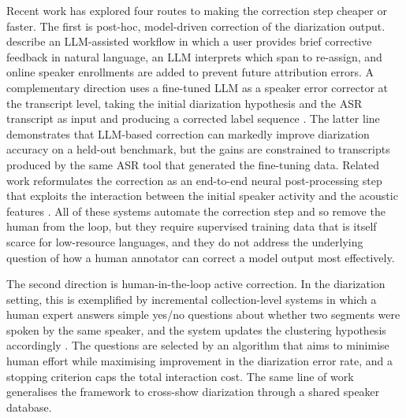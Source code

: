 \documentclass[10pt,a4paper,twocolumn]{article}
\begin{document}
Recent work has explored four routes to making the correction step
cheaper or faster. The first is post-hoc, model-driven correction of
the diarization output. \citet{he2026inmeeting} describe an
LLM-assisted workflow in which a user provides brief corrective
feedback in natural language, an LLM interprets which span to
re-assign, and online speaker enrollments are added to prevent
future attribution errors. A complementary direction uses a
fine-tuned LLM as a speaker error corrector at the transcript
level, taking the initial diarization hypothesis and the ASR
transcript as input and producing a corrected label sequence
\citep{kumar2025seal, efstathiadis2024llmdiar}. The latter
line demonstrates that LLM-based correction can markedly improve
diarization accuracy on a held-out benchmark, but the gains are
constrained to transcripts produced by the same ASR tool that
generated the fine-tuning data. Related work reformulates the
correction as an end-to-end neural post-processing step that
exploits the interaction between the initial speaker activity
and the acoustic features \citep{han2024diacorrect}. All of
these systems automate the correction step and so remove the
human from the loop, but they require supervised training data
that is itself scarce for low-resource languages, and they do
not address the underlying question of how a human annotator
can correct a model output most effectively.

The second direction is human-in-the-loop active correction. In
the diarization setting, this is exemplified by incremental
collection-level systems in which a human expert answers simple
yes/no questions about whether two segments were spoken by the
same speaker, and the system updates the clustering hypothesis
accordingly \citep{prokopalo2022active}. The questions are
selected by an algorithm that aims to minimise human effort
while maximising improvement in the diarization error rate, and
a stopping criterion caps the total interaction cost. The same
line of work generalises the framework to cross-show
diarization through a shared speaker database.
\end{document}
